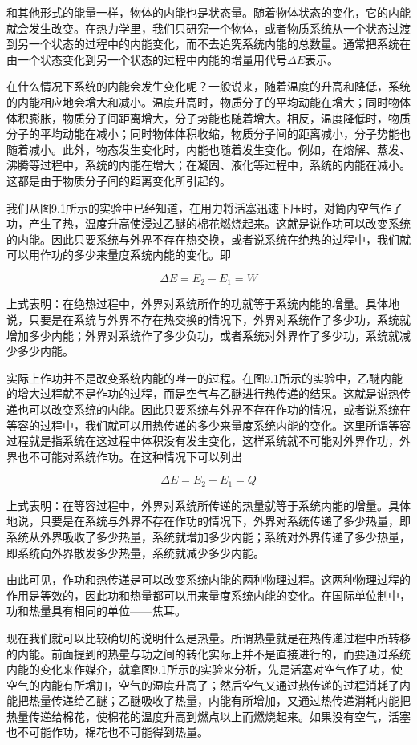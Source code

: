 和其他形式的能量一样，物体的内能也是状态量。随着物体状态的变化，它的内能就会发生改变。在热力学里，我们只研究一个物体，或者物质系统从一个状态过渡到另一个状态的过程中的内能变化，而不去追究系统内能的总数量。通常把系统在由一个状态变化到另一个状态的过程中内能的增量用代号\(\Delta E\)表示。

在什么情况下系统的内能会发生变化呢？一般说来，随着温度的升高和降低，系统的内能相应地会增大和减小。温度升高时，物质分子的平均动能在增大；同时物体体积膨胀，物质分子间距离增大，分子势能也随着增大。相反，温度降低时，物质分子的平均动能在减小；同时物体体积收缩，物质分子间的距离减小，分子势能也随着减小。此外，物态发生变化时，内能也随着发生变化。例如，在熔解、蒸发、沸腾等过程中，系统的内能在增大；在凝固、液化等过程中，系统的内能在减小。这都是由于物质分子间的距离变化所引起的。

我们从图9.1所示的实验中已经知道，在用力将活塞迅速下压时，对筒内空气作了功，产生了热，温度升高使浸过乙醚的棉花燃烧起来。这就是说作功可以改变系统的内能。因此只要系统与外界不存在热交换，或者说系统在绝热的过程中，我们就可以用作功的多少来量度系统内能的变化。即

\[
\Delta E = E _ {2} - E _ {1} = W \tag {9.3}
\]

上式表明：在绝热过程中，外界对系统所作的功就等于系统内能的增量。具体地说，只要是在系统与外界不存在热交换的情况下，外界对系统作了多少功，系统就增加多少内能；外界对系统作了多少负功，或者系统对外界作了多少功，系统就减少多少内能。

实际上作功并不是改变系统内能的唯一的过程。在图9.1所示的实验中，乙醚内能的增大过程就不是作功的过程，而是空气与乙醚进行热传递的结果。这就是说热传递也可以改变系统的内能。因此只要系统与外界不存在作功的情况，或者说系统在等容的过程中，我们就可以用热传递的多少来量度系统内能的变化。这里所谓等容过程就是指系统在这过程中体积没有发生变化，这样系统就不可能对外界作功，外界也不可能对系统作功。在这种情况下可以列出

\[
\Delta E=E_2-E_1=Q \tag{9.4}
\]

上式表明：在等容过程中，外界对系统所传递的热量就等于系统内能的增量。具体地说，只要是在系统与外界不存在作功的情况下，外界对系统传递了多少热量，即系统从外界吸收了多少热量，系统就增加多少内能；系统对外界传递了多少热量，即系统向外界散发多少热量，系统就减少多少内能。

由此可见，作功和热传递是可以改变系统内能的两种物理过程。这两种物理过程的作用是等效的，因此功和热量都可以用来量度系统内能的变化。在国际单位制中，功和热量具有相同的单位------焦耳。

现在我们就可以比较确切的说明什么是热量。所谓热量就是在热传递过程中所转移的内能。前面提到的热量与功之间的转化实际上并不是直接进行的，而要通过系统内能的变化来作媒介，就拿图9.1所示的实验来分析，先是活塞对空气作了功，使空气的内能有所增加，空气的湿度升高了；然后空气又通过热传递的过程消耗了内能把热量传递给乙醚；乙醚吸收了热量，内能有所增加，又通过热传递消耗内能把热量传递给棉花，使棉花的温度升高到燃点以上而燃烧起来。如果没有空气，活塞也不可能作功，棉花也不可能得到热量。

